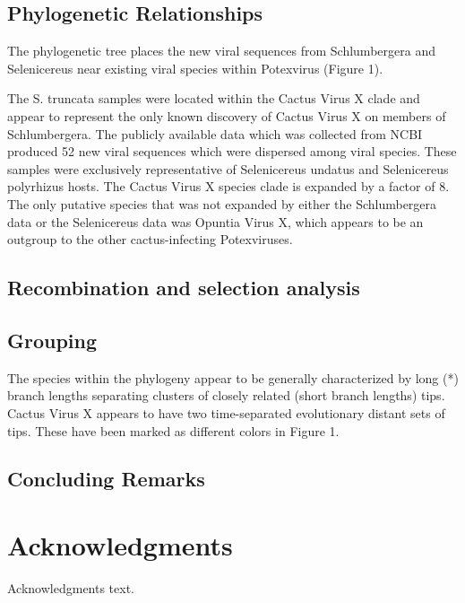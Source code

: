 \documentclass[11pt,letterpaper,titlepage]{article}
\begin{document}
\begin{linenumbers}
\subsection*{Phylogenetic Relationships}
The phylogenetic tree places the new viral sequences from Schlumbergera and Selenicereus near existing viral species within Potexvirus (Figure 1). 

The S. truncata samples were located within the Cactus Virus X clade and appear to represent the only known discovery of Cactus Virus X on members of Schlumbergera. 
The publicly available data which was collected from NCBI produced 52 new viral sequences which were dispersed among viral species. 
These samples were exclusively representative of Selenicereus undatus and Selenicereus polyrhizus hosts. 
The Cactus Virus X species clade is expanded by a factor of 8. 
The only putative species that was not expanded by either the Schlumbergera data or the Selenicereus data was Opuntia Virus X, which appears to be an outgroup to the other cactus-infecting Potexviruses. 

\subsection*{Recombination and selection analysis}
\subsection*{Grouping}
The species within the phylogeny appear to be generally characterized by long (*) branch lengths separating clusters of closely related (short branch lengths) tips. 
Cactus Virus X appears to have two time-separated evolutionary distant sets of tips. 
These have been marked as different colors in Figure 1. 

\subsection*{Concluding Remarks}

\section*{Acknowledgments}

Acknowledgments text.

\pagebreak
\raggedright{}
\setlength{\parindent}{0.0in}


\end{linenumbers}
\pagebreak
\frenchspacing
{}
\setlength{\parindent}{0.0in}
\end{document}
